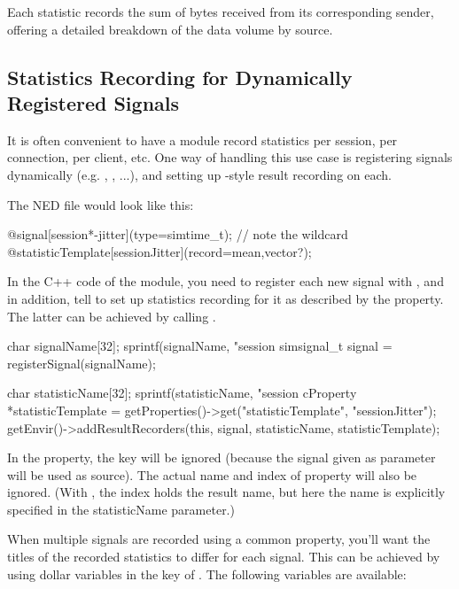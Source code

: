 Each statistic records the sum of bytes received from its corresponding sender,
offering a detailed breakdown of the data volume by source.


\subsection{Statistics Recording for Dynamically Registered Signals}
\label{sec:simple-modules:statistic-recording-dynamic-signals}

It is often convenient to have a module record statistics per session, per
connection, per client, etc. One way of handling this use case is registering
signals dynamically (e.g. , , ...),
and setting up -style result recording on each.

The NED file would look like this:

\begin{ned}
@signal[session*-jitter](type=simtime_t); // note the wildcard
@statisticTemplate[sessionJitter](record=mean,vector?);
\end{ned}

In the C++ code of the module, you need to register each new signal with
, and in addition, tell {\opp} to set up statistics
recording for it as described by the  property.
The latter can be achieved by calling .

\begin{cpp}
char signalName[32];
sprintf(signalName, "session%
simsignal_t signal = registerSignal(signalName);

char statisticName[32];
sprintf(statisticName, "session%
cProperty *statisticTemplate =
    getProperties()->get("statisticTemplate", "sessionJitter");
getEnvir()->addResultRecorders(this, signal, statisticName, statisticTemplate);
\end{cpp}

In the  property, the  key will be
ignored (because the signal given as parameter will be used as source). The
actual name and index of property will also be ignored. (With
, the index holds the result name, but here the name is
explicitly specified in the statisticName parameter.)

When multiple signals are recorded using a common 
property, you'll want the titles of the recorded statistics to differ
for each signal. This can be achieved by using dollar variables in the
 key of . The following variables
are available:

